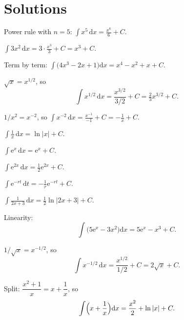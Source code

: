 \section{Solutions}

\begin{solutions}
  \item Power rule with $n=5$:
        $\displaystyle\int x^{5}\,\mathrm{d}x=\frac{x^{6}}{6}+C$.

  \item $\displaystyle\int 3x^{2}\,\mathrm{d}x
        =3\cdot\frac{x^{3}}{3}+C=x^{3}+C$.

  \item Term by term:
        $\displaystyle\int\bigl(4x^{3}-2x+1\bigr)\mathrm{d}x
         =x^{4}-x^{2}+x+C$.

  \item $\sqrt{x}=x^{1/2}$, so
        \[
          \int x^{1/2}\,\mathrm{d}x=\frac{x^{3/2}}{3/2}+C
            =\tfrac{2}{3}x^{3/2}+C .
        \]

  \item $1/x^{2}=x^{-2}$, so
        $\displaystyle\int x^{-2}\,\mathrm{d}x=\frac{x^{-1}}{-1}+C
         =-\frac{1}{x}+C$.

  \item $\displaystyle\int \frac{1}{x}\,\mathrm{d}x=\ln|x|+C$.

  \item $\displaystyle\int \mathrm{e}^{x}\,\mathrm{d}x=\mathrm{e}^{x}+C$.

  \item $\displaystyle\int \mathrm{e}^{2x}\,\mathrm{d}x
        =\tfrac12\mathrm{e}^{2x}+C$.

  \item $\displaystyle\int \mathrm{e}^{-rt}\,\mathrm{d}t
        =-\frac{1}{r}\mathrm{e}^{-rt}+C$.

  \item $\displaystyle\int \frac{1}{2x+3}\,\mathrm{d}x
        =\tfrac12\ln|2x+3|+C$.

  \item Linearity:
        \[
          \int\bigl(5\mathrm{e}^{x}-3x^{2}\bigr)\mathrm{d}x
            =5\mathrm{e}^{x}-x^{3}+C .
        \]

  \item $1/\sqrt{x}=x^{-1/2}$, so
        \[
          \int x^{-1/2}\,\mathrm{d}x=\frac{x^{1/2}}{1/2}+C=2\sqrt{x}+C .
        \]

  \item Split: $\dfrac{x^{2}+1}{x}=x+\dfrac{1}{x}$, so
        \[
          \int\Bigl(x+\frac{1}{x}\Bigr)\mathrm{d}x
            =\frac{x^{2}}{2}+\ln|x|+C .
        \]


\end{solutions}
